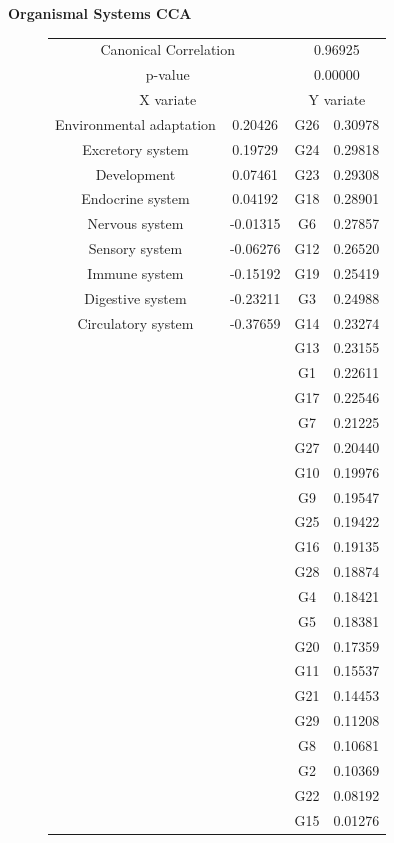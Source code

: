 \begin{figure}
  \centering
  \textbf{Organismal Systems CCA}\par\medskip
  \begin{subfigure}{.65\textwidth}
  \centering
  \begin{tabular}{ c c | c c }
    \multicolumn{2}{c}{Canonical Correlation} &  \multicolumn{2}{c}{0.96925} \\
    \multicolumn{2}{c}{p-value} &  \multicolumn{2}{c}{0.00000} \\
    \hline
    \multicolumn{2}{c}{X variate} & \multicolumn{2}{c}{Y variate}\\
    \hline
  Environmental adaptation & 0.20426 &  G26 & 0.30978\\
  Excretory system & 0.19729 &  G24 & 0.29818\\
  Development & 0.07461 &  G23 & 0.29308\\
  Endocrine system & 0.04192 &  G18 & 0.28901\\
  Nervous system & -0.01315 &  G6 & 0.27857\\
  Sensory system & -0.06276 &  G12 & 0.26520\\
  Immune system & -0.15192 &  G19 & 0.25419\\
  Digestive system & -0.23211 &  G3 & 0.24988\\
  Circulatory system & -0.37659 &  G14 & 0.23274\\
  & &  G13 & 0.23155\\
  & &  G1 & 0.22611\\
  & &  G17 & 0.22546\\
  & &  G7 & 0.21225\\
  & &  G27 & 0.20440\\
  & &  G10 & 0.19976\\
  & &  G9 & 0.19547\\
  & &  G25 & 0.19422\\
  & &  G16 & 0.19135\\
  & &  G28 & 0.18874\\
  & &  G4 & 0.18421\\
  & &  G5 & 0.18381\\
  & &  G20 & 0.17359\\
  & &  G11 & 0.15537\\
  & &  G21 & 0.14453\\
  & &  G29 & 0.11208\\
  & &  G8 & 0.10681\\
  & &  G2 & 0.10369\\
  & &  G22 & 0.08192\\
  & &  G15 & 0.01276\\
  \end{tabular}


\end{subfigure}
\end{figure}
